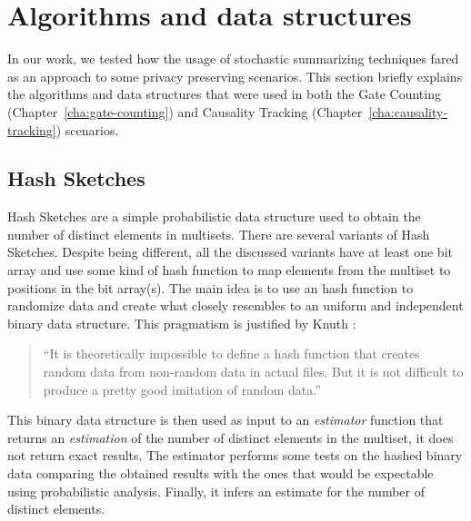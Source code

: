 
\section{Algorithms and data structures}
\label{sec:algorithms_and_data_structures}
In our work, we tested how the usage of stochastic summarizing
techniques fared as an approach to some privacy preserving scenarios.
This section briefly explains the algorithms and data structures that
were used in both the Gate Counting (Chapter~\ref{cha:gate-counting})
and Causality Tracking (Chapter~\ref{cha:causality-tracking}) scenarios.

\subsection{Hash Sketches}
\label{sec:hash_sketches}

Hash Sketches are a simple probabilistic data structure used to obtain
the number of distinct elements in multisets. There are several
variants of Hash Sketches. Despite being different, all the discussed
variants have at least one bit array and use some kind of
hash function to map elements from the multiset to positions in the
bit array(s). The main idea is to use an hash function to
randomize data and create what closely resembles to an uniform and
independent binary data structure. This pragmatism is justified by
Knuth \cite{knuth1998art}:
\begin{quotation}
``It is theoretically impossible to define a hash
function that creates random data from non-random data in actual
files. But it is not difficult to produce a pretty good imitation of
random data.''
\end{quotation}
This binary data structure is then used as input to an
\emph{estimator} function that returns an \emph{estimation} of the
number of distinct elements in the multiset, it does not return exact
results. The estimator performs some tests on the hashed
binary data comparing the obtained results with the ones that would be
expectable using probabilistic analysis. Finally, it infers an estimate
for the number of distinct elements.

